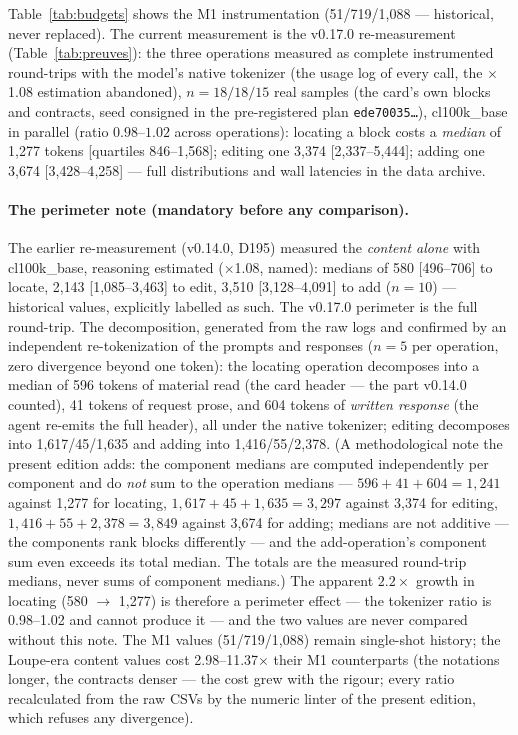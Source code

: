 \documentclass[11pt,a4paper]{article}
\newcommand{\code}[1]{\texttt{\small #1}}
\begin{document}
Table~\ref{tab:budgets} shows the M1 instrumentation (51/719/1{,}088 ---
historical, never replaced). The current measurement is the v0.17.0
re-measurement (Table~\ref{tab:preuves}): the three operations measured
as complete instrumented round-trips with the model's native tokenizer
(the usage log of every call, the $\times$1.08 estimation abandoned),
$n{=}18/18/15$ real samples (the card's own blocks and contracts, seed
consigned in the pre-registered plan \code{ede70035\ldots}),
cl100k\_base in parallel (ratio $0.98$--$1.02$ across operations):
locating a block costs a \emph{median} of 1{,}277 tokens [quartiles
846--1{,}568]; editing one 3{,}374 [2{,}337--5{,}444]; adding one 3{,}674
[3{,}428--4{,}258] --- full distributions and wall latencies in the data
archive.

\paragraph{The perimeter note (mandatory before any comparison).}
The earlier re-measurement (v0.14.0, D195) measured the \emph{content
alone} with cl100k\_base, reasoning estimated ($\times$1.08, named):
medians of 580 [496--706] to locate, 2{,}143 [1{,}085--3{,}463] to edit,
3{,}510 [3{,}128--4{,}091] to add ($n{=}10$) --- historical values,
explicitly labelled as such. The v0.17.0 perimeter is the full
round-trip. The decomposition, generated from the raw logs and
confirmed by an independent re-tokenization of the prompts and responses
($n{=}5$ per operation, zero divergence beyond one token): the locating
operation decomposes into a median of 596 tokens of material read (the
card header --- the part v0.14.0 counted), 41 tokens of request prose,
and 604 tokens of \emph{written response} (the agent re-emits the full
header), all under the native tokenizer; editing decomposes into
1{,}617/45/1{,}635 and adding into 1{,}416/55/2{,}378. (A
methodological note the present edition adds: the component medians are
computed independently per component and do \emph{not} sum to the
operation medians --- $596{+}41{+}604 = 1{,}241$ against 1{,}277 for
locating, $1{,}617{+}45{+}1{,}635 = 3{,}297$ against 3{,}374 for
editing, $1{,}416{+}55{+}2{,}378 = 3{,}849$ against 3{,}674 for adding;
medians are not additive --- the components rank blocks differently ---
and the add-operation's component sum even exceeds its total median.
The totals are the measured round-trip medians, never sums of component
medians.) The apparent
$2.2\times$ growth in locating (580 $\to$ 1{,}277) is therefore a
perimeter effect --- the tokenizer ratio is 0.98--1.02 and cannot
produce it --- and the two values are never compared without this note.
The M1 values (51/719/1{,}088) remain single-shot history; the
Loupe-era content values cost 2.98--11.37$\times$ their M1 counterparts
(the notations longer, the contracts denser --- the cost grew with the
rigour; every ratio recalculated from the raw CSVs by the numeric
linter of the present edition, which refuses any divergence).
\end{document}

